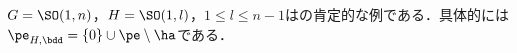 \begin{cor}\label{cor:prob-eg}
  $G = \SO(1,n) $，$H = \SO(1,l) $，$1\leq l\leq n-1$はの肯定的な例である．具体的には$\pe_{H,\bdd} = \{0\}\cup \pe\setminus\ha $である．%
\end{cor}





